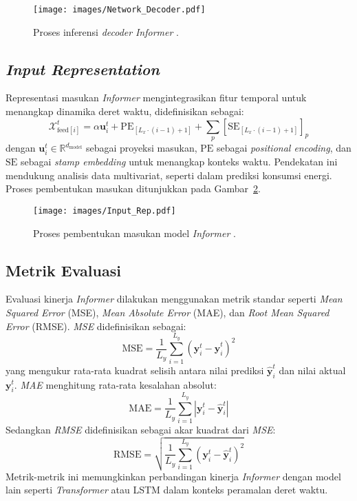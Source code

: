 \begin{figure}[H]
    \centering
    \texttt{[image: images/Network\_Decoder.pdf]}
    \caption{Proses inferensi \textit{decoder} \textit{Informer} \citep{Zhou2021}.}
    \label{fig:network_decoder}
\end{figure}

\subsection{\textit{Input Representation}}
\label{sec:input_representation}

Representasi masukan \textit{Informer} mengintegrasikan fitur temporal untuk menangkap dinamika deret waktu, didefinisikan sebagai:
\begin{equation}
\mathcal{X}_{\text{feed}[i]}^t = \alpha \mathbf{u}_i^t + \text{PE}_{[L_x \cdot (i-1) + 1]} + \sum_p [\text{SE}_{[L_x \cdot (i-1) + 1]}]_p
\end{equation}
dengan \( \mathbf{u}_i^t \in \mathbb{R}^{d_{\text{model}}} \) sebagai proyeksi masukan, \( \text{PE} \) sebagai \textit{positional encoding}, dan \( \text{SE} \) sebagai \textit{stamp embedding} untuk menangkap konteks waktu. Pendekatan ini mendukung analisis data multivariat, seperti dalam prediksi konsumsi energi. Proses pembentukan masukan ditunjukkan pada Gambar~\ref{fig:input_rep}.

\begin{figure}[H]
    \centering
    \texttt{[image: images/Input\_Rep.pdf]}
    \caption{Proses pembentukan masukan model \textit{Informer} \citep{Zhou2021}.}
    \label{fig:input_rep}
\end{figure}

\subsection{Metrik Evaluasi}
\label{sec:evaluation_metrics}

Evaluasi kinerja \textit{Informer} dilakukan menggunakan metrik standar seperti \textit{Mean Squared Error} (MSE), \textit{Mean Absolute Error} (MAE), dan \textit{Root Mean Squared Error} (RMSE). \textit{MSE} didefinisikan sebagai:
\begin{equation}
\text{MSE} = \frac{1}{L_y} \sum_{i=1}^{L_y} (\mathbf{y}_i^t - \hat{\mathbf{y}}_i^t)^2
\end{equation}
yang mengukur rata-rata kuadrat selisih antara nilai prediksi \( \hat{\mathbf{y}}_i^t \) dan nilai aktual \( \mathbf{y}_i^t \). \textit{MAE} menghitung rata-rata kesalahan absolut:
\begin{equation}
\text{MAE} = \frac{1}{L_y} \sum_{i=1}^{L_y} |\mathbf{y}_i^t - \hat{\mathbf{y}}_i^t|
\end{equation}
Sedangkan \textit{RMSE} didefinisikan sebagai akar kuadrat dari \textit{MSE}:
\begin{equation}
\text{RMSE} = \sqrt{\frac{1}{L_y} \sum_{i=1}^{L_y} (\mathbf{y}_i^t - \hat{\mathbf{y}}_i^t)^2}
\end{equation}
Metrik-metrik ini memungkinkan perbandingan kinerja \textit{Informer} dengan model lain seperti \textit{Transformer} atau LSTM dalam konteks peramalan deret waktu.
